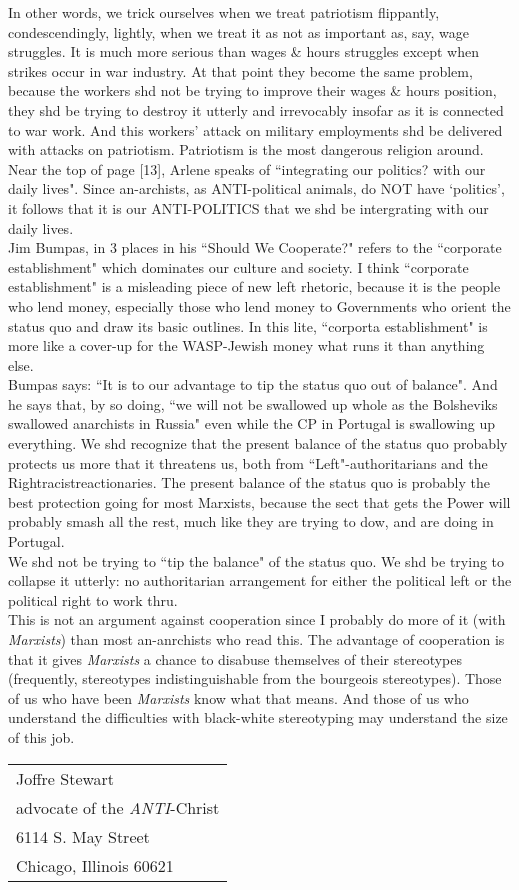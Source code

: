 In other words, we trick ourselves when we treat patriotism flippantly, condescendingly, lightly, when we treat it as not as important as, say, wage struggles. It is much more serious than wages \& hours struggles except when strikes occur in war industry. At that point they become the same problem, because the workers shd not be trying to improve their wages \& hours position, they shd be trying to destroy it utterly and irrevocably insofar as it is connected to war work. And this workers' attack on military employments shd be delivered with attacks on patriotism. Patriotism is the most dangerous religion around.\\
Near the top of page [13], Arlene speaks of ``integrating our politics? with our daily lives". Since an-archists, as ANTI-political animals, do NOT have `politics', it follows that it is our ANTI-POLITICS that we shd be intergrating with our daily lives.\\
Jim Bumpas, in 3 places in his ``Should We Cooperate?" refers to the ``corporate establishment" which dominates our culture and society. I think ``corporate establishment" is a misleading piece of new left rhetoric, because it is the people who lend money, especially those who lend money to Governments who orient the status quo and draw its basic outlines. In this lite, ``corporta establishment" is more like a cover-up for the WASP-Jewish money what runs it than anything else.\\
Bumpas says: ``It is to our advantage to tip the status quo out of balance". And he says that, by so doing, ``we will not be swallowed up whole as the Bolsheviks swallowed anarchists in Russia" even while the CP in Portugal is swallowing up everything. We shd recognize that the present balance of the status quo probably protects us more that it threatens us, both from ``Left"-authoritarians and the Rightracistreactionaries. The present balance of the status quo is probably the best protection going for most Marxists, because the sect that gets the Power will probably smash all the rest, much like they are trying to dow, and are doing in Portugal.\\
We shd not be trying to ``tip the balance" of the status quo. We shd be trying to collapse it utterly: no authoritarian arrangement for either the political left or the political right to work thru.\\
This is not an argument against cooperation since I probably do more of it (with \emph{Marxists}) than most an-anrchists who read this. The advantage of cooperation is that it gives \emph{Marxists} a chance to disabuse themselves of their stereotypes (frequently, stereotypes indistinguishable from the bourgeois stereotypes). Those of us who have been \emph{Marxists} know what that means. And those of us who understand the difficulties with black-white stereotyping may understand the size of this job.

\par\begin{flushright}
\begin{tabular}{l}
Joffre Stewart\\advocate of the \emph{ANTI}-Christ\\6114 S. May Street\\Chicago, Illinois 60621 
\end{tabular} 
\end{flushright}